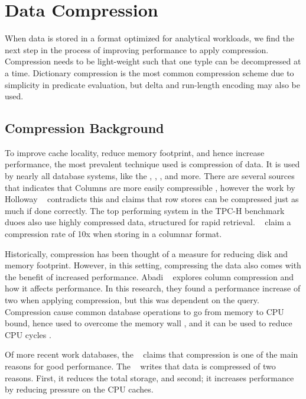 \chapter{Data Compression}
\label{chap:Data Compression}
When data is stored in a format optimized for analytical workloads, we find the next step in the process of improving performance to apply compression. Compression needs to be light-weight such that one typle can be decompressed at a time. Dictionary compression is the most common compression scheme due to simplicity in predicate evaluation, but delta and run-length encoding may also be used.
\newpage
\section{Compression Background}
\label{sec:Compression Background}

To improve cache locality, reduce memory footprint, and hence increase performance, the most prevalent technique used is compression of data. It is used by nearly all database systems, like the  \cite{Raman2013-em},  \cite{Stonebraker2005-qz},  \cite{Lamb2012-kg}, and more. There are several sources that indicates that Columns are more easily compressible , however the work by Holloway \ea~\cite{Holloway2008-rr} contradicts this and claims that row stores can be compressed just as much if done correctly. The top performing system in the TPC-H benchmark duoes also use highly compressed data, structured for rapid retrieval. \mssql~\cite{noauthor_undated-vq} claim a compression rate of 10x when storing in a columnar format.

Historically, compression has been thought of a measure for reducing disk and memory footprint. However, in this setting, compressing the data also comes with the benefit of increased performance. Abadi \ea~\cite{Abadi2008-dd} explores column compression and how it affects performance. In this research, they found a performance increase of two when applying compression, but this was dependent on the query. Compression cause common database operations to go from memory to CPU bound, hence used to overcome the memory wall \cite{Willhalm2009-hu}, and it can be used to reduce CPU cycles \cite{Stonebraker2005-qz}.

Of more recent work databases, the \gorilla~\cite{Pelkonen2015-ko} claims that compression is one of the main reasons for good performance. The \exasol~\cite{Exasol2014-xh} writes that data is compressed of two reasons. First, it reduces the total storage, and second; it increases performance by reducing pressure on the CPU caches.

